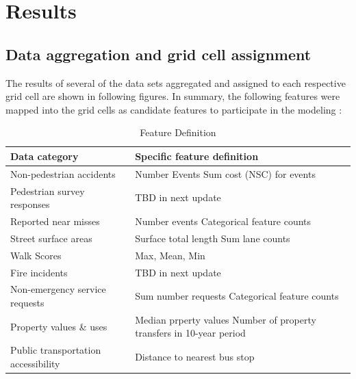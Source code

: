\documentclass{llncs}
\begin{document}
\section{Results}
%
\subsection{Data aggregation and grid cell assignment}


The results of several of the data sets aggregated and assigned to each respective grid cell are shown in following figures. In summary, the following features were mapped into the grid cells as candidate features to participate in the modeling :

\FloatBarrier
\begin{table}
\begin{center}
\caption{Feature Definition}
\label{table : featureDefinition}
\begin{tabular}{p{50mm} p{60mm}}
\hline
\rule{0pt}{12pt}
Data category & Specific feature definition	\\[2pt]
\hline
Non-pedestrian accidents 		& Number Events \newline
															Sum cost (NSC) for events \\
Pedestrian survey responses & TBD in next update \\
Reported near misses 				& Number events \newline
                                                            Categorical feature counts \\
Street surface areas 				& Surface total length \newline
                                                            Sum lane counts  \\
Walk Scores 								& Max, Mean, Min  \\
Fire incidents 								& TBD in next update  \\
Non-emergency service requests & Sum number requests \newline
                                                                      Categorical feature counts\\ 
Property values \& uses 			& Median prperty values \newline
                                                            Number of property transfers in 10-year period  \\
Public transportation accessibility & Distance to nearest bus stop \\[2pt]
\hline
\end{tabular}
\end{center}
\end{table}
\FloatBarrier
%
\end{document}
